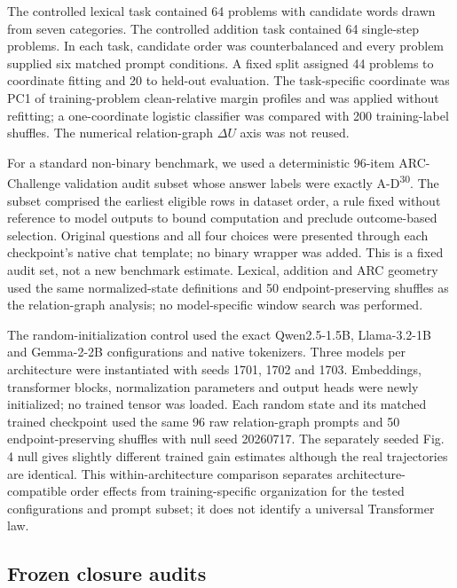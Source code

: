 \documentclass[12pt]{article}
\begin{document}
The controlled lexical task contained 64 problems with candidate words drawn from seven categories. The controlled addition task contained 64 single-step problems. In each task, candidate order was counterbalanced and every problem supplied six matched prompt conditions. A fixed split assigned 44 problems to coordinate fitting and 20 to held-out evaluation. The task-specific coordinate was PC1 of training-problem clean-relative margin profiles and was applied without refitting; a one-coordinate logistic classifier was compared with 200 training-label shuffles. The numerical relation-graph \(\Delta U\) axis was not reused.

For a standard non-binary benchmark, we used a deterministic 96-item ARC-Challenge validation audit subset whose answer labels were exactly A-D\textsuperscript{30}. The subset comprised the earliest eligible rows in dataset order, a rule fixed without reference to model outputs to bound computation and preclude outcome-based selection. Original questions and all four choices were presented through each checkpoint's native chat template; no binary wrapper was added. This is a fixed audit set, not a new benchmark estimate. Lexical, addition and ARC geometry used the same normalized-state definitions and 50 endpoint-preserving shuffles as the relation-graph analysis; no model-specific window search was performed.

The random-initialization control used the exact Qwen2.5-1.5B, Llama-3.2-1B and Gemma-2-2B configurations and native tokenizers. Three models per architecture were instantiated with seeds 1701, 1702 and 1703. Embeddings, transformer blocks, normalization parameters and output heads were newly initialized; no trained tensor was loaded. Each random state and its matched trained checkpoint used the same 96 raw relation-graph prompts and 50 endpoint-preserving shuffles with null seed 20260717. The separately seeded Fig. 4 null gives slightly different trained gain estimates although the real trajectories are identical. This within-architecture comparison separates architecture-compatible order effects from training-specific organization for the tested configurations and prompt subset; it does not identify a universal Transformer law.

\subsection*{Frozen closure audits}
\end{document}
